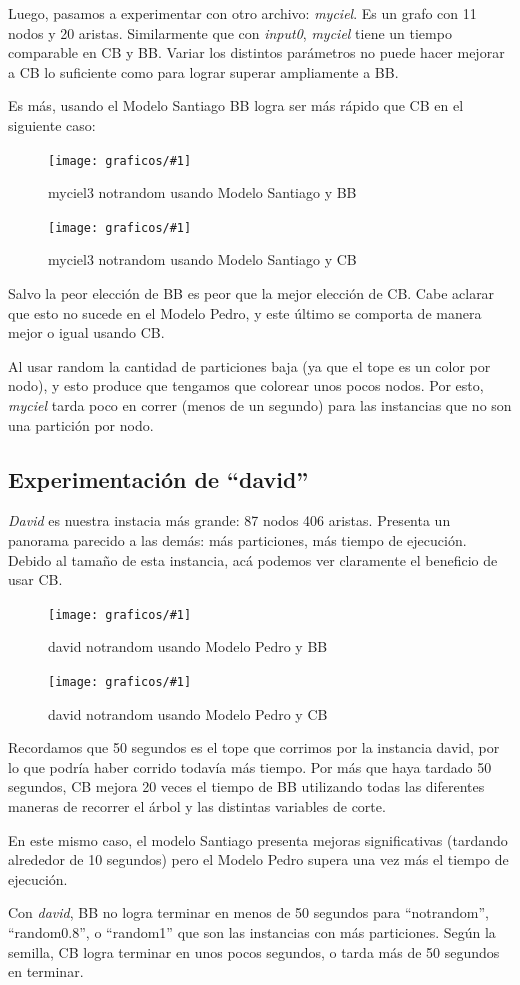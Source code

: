 \documentclass[a4paper, 10pt, twoside]{article}
\newcommand{\diagramavfig}[2]{%
  \begin{figure}[H]
    \texttt{[image: graficos/\#1]}%
    \caption{#2}
    \label{fig:#1}
  \end{figure}
}
\begin{document}
Luego, pasamos a experimentar con otro archivo: \emph{myciel}. Es un grafo con 11 nodos y 20 aristas. Similarmente que con \emph{input0}, \textit{myciel} tiene un tiempo comparable en CB y BB. Variar los distintos parámetros no puede hacer mejorar a CB lo suficiente como para lograr superar ampliamente a BB.

Es más, usando el Modelo Santiago BB logra ser más rápido que CB en el siguiente caso:

\diagramavfig{myciel3_notrandom_1_bb_1_segunJuntada}{myciel3 notrandom usando Modelo Santiago y BB}
\diagramavfig{myciel3_notrandom_1_cb_1_segunJuntada}{myciel3 notrandom usando Modelo Santiago y CB}

Salvo la peor elección de BB es peor que la mejor elección de CB. Cabe aclarar que esto no sucede en el Modelo Pedro, y este último se comporta de manera mejor o igual usando CB.

Al usar random la cantidad de particiones baja (ya que el tope es un color por nodo), y esto produce que tengamos que colorear unos pocos nodos. Por esto, \textit{myciel} tarda poco en correr (menos de un segundo) para las instancias que no son una partición por nodo.

\subsection{Experimentación de ``david''}

\textit{David} es nuestra instacia más grande: 87 nodos 406 aristas. Presenta un panorama parecido a las demás: más particiones, más tiempo de ejecución. Debido al tamaño de esta instancia, acá podemos ver claramente el beneficio de usar CB.

\diagramavfig{david_notrandom_1_bb_0_segunJuntada}{david notrandom usando Modelo Pedro y BB}
\diagramavfig{david_notrandom_1_cb_0_segunJuntada}{david notrandom usando Modelo Pedro y CB}

Recordamos que 50 segundos es el tope que corrimos por la instancia david, por lo que podría haber corrido todavía más tiempo. Por más que haya tardado 50 segundos, CB mejora 20 veces el tiempo de BB utilizando todas las diferentes maneras de recorrer el árbol y las distintas variables de corte.

En este mismo caso, el modelo Santiago presenta mejoras significativas (tardando alrededor de 10 segundos) pero el Modelo Pedro supera una vez más el tiempo de ejecución.

Con \emph{david}, BB no logra terminar en menos de 50 segundos para ``notrandom'', ``random0.8'', o ``random1'' que son las instancias con más particiones. Según la semilla, CB logra terminar en unos pocos segundos, o tarda más de 50 segundos en terminar.
\end{document}
